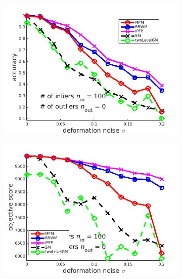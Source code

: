 \documentclass[
	fontsize=12pt,
	paper=a4,
	twoside=false,
	numbers=noenddot,
	plainheadsepline,
	toc=listof,
	toc=bibliography
]{scrartcl}
\begin{document}
\begin{figure}[h] 
	\begin{subfigure}[b]{0.3\textwidth}
		\centering
		\includegraphics[scale=0.25]{"fig_ver2608/syntheticPointSets/ver4.2.1/deformation/accuracy_avg10t"} 
	\end{subfigure}%
	\begin{subfigure}[b]{0.3\textwidth}
		\centering
		\includegraphics[scale=0.25]{"fig_ver2608/syntheticPointSets/ver4.2.1/deformation/score_avg10t"} 
	\end{subfigure} 
	\begin{subfigure}[b]{0.3\textwidth}
		\centering

\end{subfigure}
\end{figure}
\end{document}
